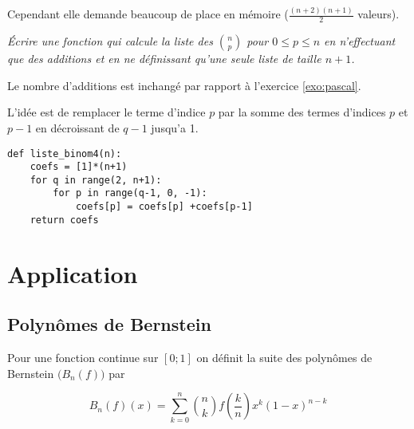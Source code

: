 Cependant elle demande beaucoup de place en mémoire ($\frac{(n+2)(n+1)}2$ valeurs).
\begin{Exercise}[difficulty=2]
\it Écrire une fonction  qui calcule la liste des $\binom np$ pour $0\le p \le n$ en n'effectuant que des additions et en ne définissant qu'une seule liste de taille $n+1$. 

Le nombre d'additions est inchangé par rapport à l'exercice \ref{exo:pascal}.
\end{Exercise}
\begin{Answer}
L'idée est de remplacer le terme d'indice $p$ par la somme des termes d'indices $p$ et $p-1$ en décroissant de $q-1$ jusqu'a 1.
\begin{lstlisting}
def liste_binom4(n):
    coefs = [1]*(n+1)
    for q in range(2, n+1):
        for p in range(q-1, 0, -1):
            coefs[p] = coefs[p] +coefs[p-1]
    return coefs
\end{lstlisting}
\end{Answer}
\newpage
\section{Application}
\subsection{Polynômes de Bernstein}
Pour une fonction continue sur $[0;1]$ on définit la suite des polynômes de Bernstein $\bigl(B_n(f)\bigr)$ par

\[B_n(f)(x)=\sum_{k=0}^n \binom nk{\textstyle f\left(\frac kn\right)} x^k(1-x)^{n-k}\]

